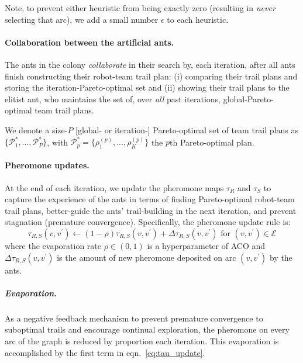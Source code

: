 \documentclass[11pt, oneside]{article}
\begin{document}
Note, to prevent either heuristic from being exactly zero (resulting in \emph{never} selecting that arc), we add a small number $\epsilon$ to each heuristic.

\paragraph{Collaboration between the artificial ants.}
The ants in the colony \emph{collaborate} in their search by, each iteration, after all ants finish constructing their robot-team trail plan:
(i) comparing their trail plans and storing the iteration-Pareto-optimal set and
(ii) showing their trail plans to the elitist ant, who maintains the set of, over \emph{all} past iterations, global-Pareto-optimal team trail plans.

We denote a size-$P$ [global- or iteration-] Pareto-optimal set of team trail plans as $\{\mathcal{P}_1^*, ..., \mathcal{P}_P^*\}$, with $\mathcal{P}^*_p=\{\rho_1^{(p)}, ..., \rho_K^{(p)}\}$ the $p$th Pareto-optimal plan.


\paragraph{Pheromone updates.} At the end of each iteration, we update the pheromone maps $\tau_R$ and $\tau_S$ to capture the experience of the ants in terms of finding Pareto-optimal robot-team trail plans, better-guide the ants' trail-building in the next iteration, and  prevent stagnation (premature convergence). Specifically, the pheromone update rule is:
\begin{equation}
	\tau_{R, S}(v, v^\prime) \leftarrow (1-\rho) \tau_{R,S}(v, v^\prime)  + \Delta \tau_{R,S}(v, v^\prime) \text{ for } (v, v^\prime) \in \mathcal{E} \label{eq:tau_update}
\end{equation}
where the evaporation rate $\rho \in (0, 1)$ is a hyperparameter of ACO and $\Delta \tau_{R,S}(v, v^\prime)$ is the amount of new pheromone deposited on arc $(v, v^\prime)$ by the ants.

\subparagraph{Evaporation.} 
As a negative feedback mechanism to prevent premature convergence to suboptimal trails and encourage continual exploration, the pheromone on every arc of the graph is reduced by proportion each iteration. This evaporation is accomplished by the first term in eqn.~\ref{eq:tau_update}.
\end{document}
